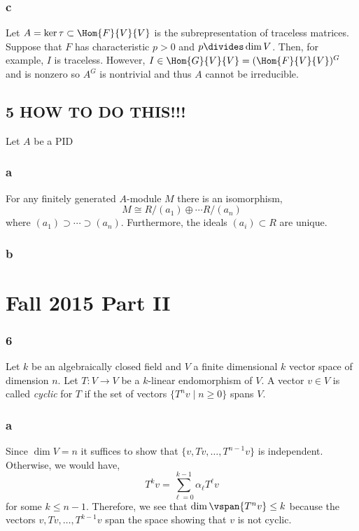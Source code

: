 \documentclass[12pt]{article}
\begin{document}
\subsubsection{c}

Let $A = \ker{\tau} \subset \Hom{F}{V}{V}$ is the subrepresentation of traceless matrices. Suppose that $F$ has characteristic $p > 0$ and $p \divides \dim{V}$. Then, for example, $I$ is traceless. However, $I \in \Hom{G}{V}{V} = (\Hom{F}{V}{V})^G$ and is nonzero so $A^G$ is nontrivial and thus $A$ cannot be irreducible.

\subsection{5 HOW TO DO THIS!!!}

Let $A$ be a PID

\subsubsection{a}

For any finitely generated $A$-module $M$ there is an isomorphism,
\[ M \cong R/(a_1) \oplus \cdots R/(a_n) \]
where $(a_1) \supset \cdots \supset (a_n)$. Furthermore, the ideals $(a_i) \subset R$ are unique. 

\subsubsection{b}


\section{Fall 2015 Part II}

\subsubsection{6}

Let $k$ be an algebraically closed field and $V$ a finite dimensional $k$ vector space of dimension $n$. Let $T : V \to V$ be a $k$-linear endomorphism of $V$. A vector $v \in V$ is called \textit{cyclic} for $T$ if the set of vectors $\{ T^n v  \mid n \ge 0 \}$ spans $V$.

\subsubsection{a}

Since $\dim{V} = n$ it suffices to show that $\{ v, T v, \dots, T^{n-1} v \}$ is independent. Otherwise, we would have,
\[ T^{k} v = \sum_{\ell = 0}^{k-1} \alpha_\ell T^{\ell} v \]
for some $k \le n - 1$. Therefore, we see that $\dim{\vspan{ T^n v}} \le k$ because the vectors $v, Tv, \dots, T^{k-1} v$ span the space showing that $v$ is not cyclic.
\end{document}
